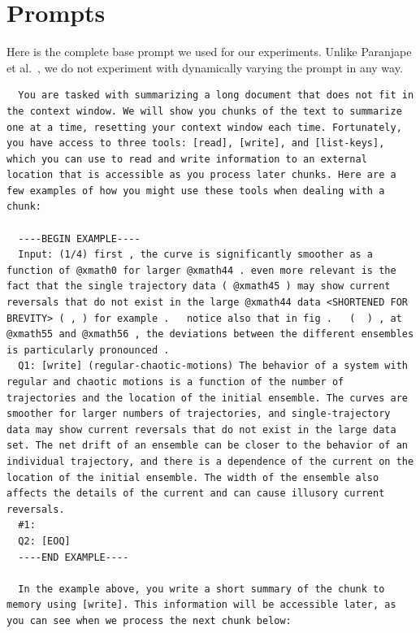 \documentclass{article}
\begin{document}




\appendix

\section{Prompts}\label{section:prompts}

Here is the complete base prompt we used for our experiments. Unlike Paranjape et al.~\cite{paranjape2023art}, we do not experiment with dynamically varying the prompt in any way.


\begin{lstlisting}
  You are tasked with summarizing a long document that does not fit in the context window. We will show you chunks of the text to summarize one at a time, resetting your context window each time. Fortunately, you have access to three tools: [read], [write], and [list-keys], which you can use to read and write information to an external location that is accessible as you process later chunks. Here are a few examples of how you might use these tools when dealing with a chunk:

  ----BEGIN EXAMPLE----
  Input: (1/4) first , the curve is significantly smoother as a function of @xmath0 for larger @xmath44 . even more relevant is the fact that the single trajectory data ( @xmath45 ) may show current reversals that do not exist in the large @xmath44 data <SHORTENED FOR BREVITY> ( , ) for example .   notice also that in fig .   (  ) , at @xmath55 and @xmath56 , the deviations between the different ensembles is particularly pronounced .
  Q1: [write] (regular-chaotic-motions) The behavior of a system with regular and chaotic motions is a function of the number of trajectories and the location of the initial ensemble. The curves are smoother for larger numbers of trajectories, and single-trajectory data may show current reversals that do not exist in the large data set. The net drift of an ensemble can be closer to the behavior of an individual trajectory, and there is a dependence of the current on the location of the initial ensemble. The width of the ensemble also affects the details of the current and can cause illusory current reversals.
  #1:
  Q2: [EOQ]
  ----END EXAMPLE----

  In the example above, you write a short summary of the chunk to memory using [write]. This information will be accessible later, as you can see when we process the next chunk below:


\end{lstlisting}
\end{document}
